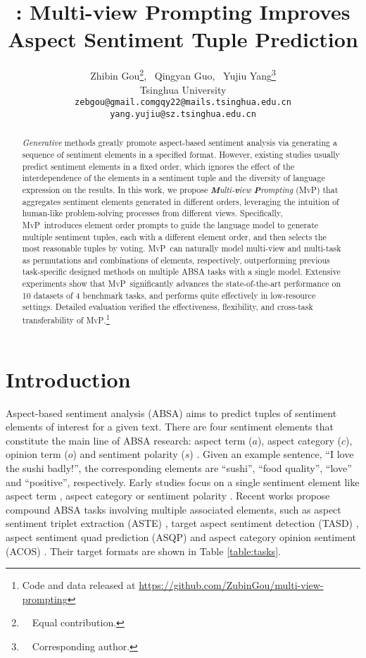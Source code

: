 \documentclass[11pt]{article}
\title{\mvp: Multi-view Prompting Improves Aspect Sentiment Tuple Prediction}
\author{Zhibin Gou\thanks{~~Equal contribution.}, ~Qingyan Guo\samethanks, ~Yujiu Yang\thanks{~~Corresponding author.}\\
   Tsinghua University \\
  \texttt{zebgou@gmail.com\quad gqy22@mails.tsinghua.edu.cn}\\
  \texttt{yang.yujiu@sz.tsinghua.edu.cn}\\}
\newcommand\mvp{\textsc{MvP}}
\begin{document}
\maketitle

\begin{abstract}


\emph{Generative} methods greatly promote aspect-based sentiment analysis via generating a sequence of sentiment elements in a specified format.
However, existing studies usually predict sentiment elements in a fixed order, which ignores the effect of the interdependence of the elements in a sentiment tuple and the diversity of language expression on the results.
In this work, we propose \emph{\textbf{M}ulti-\textbf{v}iew \textbf{P}rompting} (\mvp) that aggregates sentiment elements generated in different orders, leveraging the intuition of human-like problem-solving processes from different views.
Specifically, \mvp~introduces element order prompts to guide the language model to generate multiple sentiment tuples, each with a different element order, and then selects the most reasonable tuples by voting.
\mvp~can naturally model multi-view and multi-task as permutations and combinations of elements, respectively, outperforming previous task-specific designed methods on multiple ABSA tasks with a single model.
Extensive experiments show that \mvp~significantly advances the state-of-the-art performance on 10 datasets of 4 benchmark tasks, and performs quite effectively in low-resource settings.
Detailed evaluation verified the effectiveness, flexibility, and cross-task transferability of \mvp.\footnote{Code and data released at \url{https://github.com/ZubinGou/multi-view-prompting}}


\end{abstract}




\section{Introduction}

Aspect-based sentiment analysis (ABSA) aims to predict tuples of sentiment elements of interest for a given text. There are four sentiment elements that constitute the main line of ABSA research: aspect term ($a$), aspect category ($c$), opinion term ($o$) and sentiment polarity ($s$) \cite{DBLP:journals/corr/abs-2203-01054}. Given an example sentence, ``I love the sushi badly!'', the corresponding elements are ``sushi'', ``food quality'', ``love'' and ``positive'', respectively.
Early studies focus on a single sentiment element like aspect term \cite{liu-etal-2015-fine, ma-etal-2019-exploring}, aspect category \cite{DBLP:conf/aaai/ZhouWX15} or sentiment polarity \cite{wang-etal-2016-attention, chen-etal-2017-recurrent}.
Recent works propose compound ABSA tasks involving multiple associated elements, such as aspect sentiment triplet extraction (ASTE) \cite{DBLP:conf/aaai/PengXBHLS20}, target aspect sentiment detection (TASD) \cite{DBLP:conf/aaai/WanYDLQP20}, aspect sentiment quad prediction (ASQP) \cite{zhang-etal-2021-aspect} and aspect category opinion sentiment (ACOS) \cite{DBLP:conf/coling/CaiTZYX20}. Their target formats are shown in Table \ref{table:tasks}.
\end{document}
